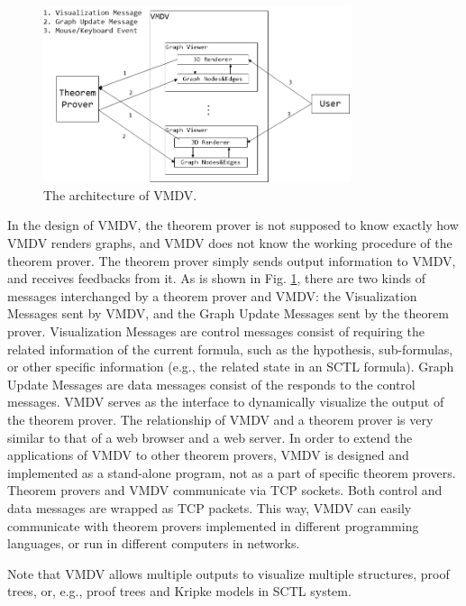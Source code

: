 \documentclass[runningheads]{llncs}
\newcommand\tool[1]{\textsf{#1}}
\newcommand\vmdv{\tool{VMDV}}
\begin{document}
\begin{figure}[!h]
\scriptsize
\centering
\includegraphics[width=9cm]{./architecture.png}
\caption{The architecture of \textsf{VMDV}.}
\label{fig:architecture}
\end{figure}
In the design of \vmdv{}, the theorem prover is not supposed to know exactly how \vmdv{} renders graphs, and \vmdv{} does not know the working procedure of the theorem prover. The theorem prover simply sends output information to \textsf{VMDV}, and receives feedbacks from it. As is shown in Fig. \ref{fig:architecture}, there are two kinds of messages interchanged by a theorem prover and \vmdv{}: the Visualization Messages sent by \vmdv{}, and the Graph Update Messages sent by the theorem prover. Visualization Messages are control messages consist of requiring the related information of the current formula, such as the hypothesis, sub-formulas, or other specific information (e.g., the related state in an SCTL formula). Graph Update Messages are data messages consist of the responds to the control messages.
\vmdv{} serves as the interface to dynamically visualize the output of the theorem prover. The relationship of \vmdv{} and a theorem prover is very similar to that of a web browser and a web server. In order to extend the applications of \vmdv{} to other theorem provers, \vmdv{} is designed and implemented as a stand-alone program, not as a part of specific theorem provers. Theorem provers and \vmdv{} communicate via TCP sockets. Both control and data messages are wrapped as TCP packets.  This way, \vmdv{} can easily communicate with theorem provers implemented in different programming languages, or run in different computers in networks.
 
Note that \vmdv{} allows multiple outputs to visualize multiple structures, proof trees, or, e.g., proof trees and Kripke models in \textsf{SCTL} system.
 
\end{document}
